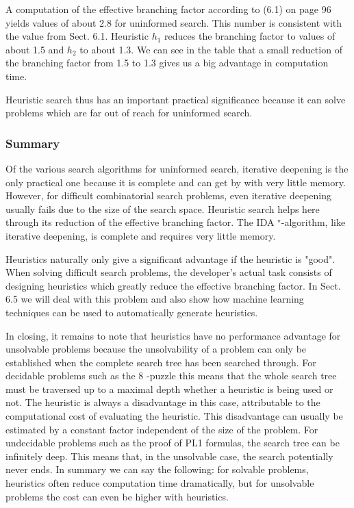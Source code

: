 \documentclass[10pt]{book}
\begin{document}
A computation of the effective branching factor according to (6.1) on page 96 yields values of about 2.8 for uninformed search. This number is consistent with the value from Sect. 6.1. Heuristic $h_{1}$ reduces the branching factor to values of about 1.5 and $h_{2}$ to about 1.3. We can see in the table that a small reduction of the branching factor from 1.5 to 1.3 gives us a big advantage in computation time.

Heuristic search thus has an important practical significance because it can solve problems which are far out of reach for uninformed search.

\subsubsection*{Summary}
Of the various search algorithms for uninformed search, iterative deepening is the only practical one because it is complete and can get by with very little memory. However, for difficult combinatorial search problems, even iterative deepening usually fails due to the size of the search space. Heuristic search helps here through its reduction of the effective branching factor. The IDA ${ }^{\star}$-algorithm, like iterative deepening, is complete and requires very little memory.

Heuristics naturally only give a significant advantage if the heuristic is "good". When solving difficult search problems, the developer's actual task consists of designing heuristics which greatly reduce the effective branching factor. In Sect. 6.5 we will deal with this problem and also show how machine learning techniques can be used to automatically generate heuristics.

In closing, it remains to note that heuristics have no performance advantage for unsolvable problems because the unsolvability of a problem can only be established when the complete search tree has been searched through. For decidable problems such as the 8 -puzzle this means that the whole search tree must be traversed up to a maximal depth whether a heuristic is being used or not. The heuristic is always a disadvantage in this case, attributable to the computational cost of evaluating the heuristic. This disadvantage can usually be estimated by a constant factor independent of the size of the problem. For undecidable problems such as the proof of PL1 formulas, the search tree can be infinitely deep. This means that, in the unsolvable case, the search potentially never ends. In summary we can say the following: for solvable problems, heuristics often reduce computation time dramatically, but for unsolvable problems the cost can even be higher with heuristics.
\end{document}
